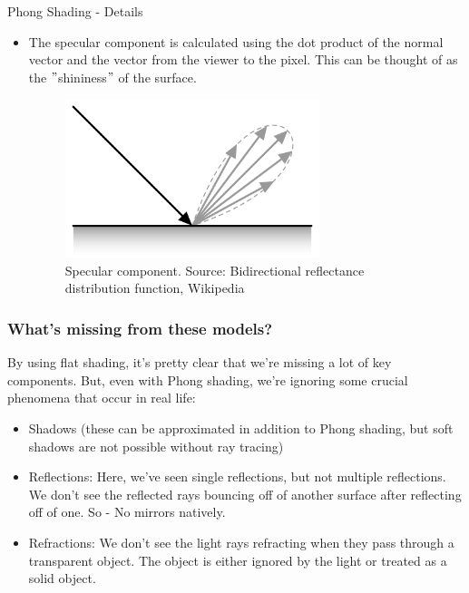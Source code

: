 \documentclass{beamer}
\begin{document}
  \begin{frame}{Phong Shading - Details}

    \begin{itemize}
      \item The specular component is calculated using the dot product of the normal vector and the vector from the viewer to the pixel.
      This can be thought of as the \("\)shininess\("\) of the surface.

      \begin{figure}
        \centering
        \includegraphics[width=0.7\textwidth]{specular.png}
        \caption{Specular component. Source: Bidirectional reflectance distribution function, Wikipedia}\label{fig:specular}
      \end{figure}


    \end{itemize}




  \end{frame}

  \begin{frame}
    \frametitle{What's missing from these models?}

    By using flat shading, it's pretty clear that we're missing a lot of key components.
    But, even with Phong shading, we're ignoring some crucial phenomena that occur in real life:

    \begin{itemize}
      \item Shadows (these can be approximated in addition to Phong shading, but soft shadows are not possible without ray tracing)
      \item Reflections: Here, we've seen single reflections, but not multiple reflections.
      We don't see the reflected rays bouncing off of another surface after reflecting off of one. So - No mirrors natively.
      \item Refractions: We don't see the light rays refracting when they pass through a transparent object.
      The object is either ignored by the light or treated as a solid object.
    \end{itemize}

  \end{frame}
\end{document}
